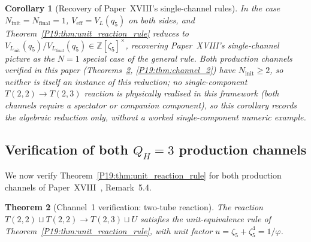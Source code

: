 \documentclass[11pt,a4paper]{article}
\newtheorem{theorem}{Theorem}[section]
\newtheorem{corollary}[theorem]{Corollary}
\theoremstyle{definition}\newtheorem{definition}[theorem]{Definition}
\theoremstyle{remark}
\newcommand{\vp}{\varphi}
\newcommand{\QH}{Q_H}
\newcommand{\Jones}{V}
\begin{document}
\begin{corollary}[Recovery of Paper~XVIII's single-channel rules]
\label{P19:cor:single_channel_recovery}
In the case $N_{\mathrm{init}}=N_{\mathrm{final}}=1$,
$\Jones_{\mathrm{eff}}=\Jones_{L}(q_5)$ on both sides, and
Theorem~\ref{P19:thm:unit_reaction_rule} reduces to
$\Jones_{L_{\mathrm{init}}}(q_5)/\Jones_{L_{\mathrm{final}}}(q_5)\in
\mathbb{Z}[\zeta_5]^\times$, recovering Paper~XVIII's single-channel
picture as the $N=1$ special case of the general rule.  Both
production channels verified in this paper (Theorems~\ref{P19:thm:channel_1},
\ref{P19:thm:channel_2}) have $N_{\mathrm{init}}\geq2$, so neither
is itself an instance of this reduction; no single-component
$T(2,2)\to T(2,3)$ reaction is physically realised in this
framework (both channels require a spectator or companion
component), so this corollary records the algebraic reduction only,
without a worked single-component numeric example.
\end{corollary}

\subsection{Verification of both $\QH=3$ production channels}

We now verify Theorem~\ref{P19:thm:unit_reaction_rule} for both
production channels of Paper~XVIII~\cite{Paper18},
Remark~5.4. %

\begin{theorem}[Channel~1 verification: two-tube reaction]
\label{P19:thm:channel_1}
The reaction
$T(2,2)\sqcup T(2,2)\to T(2,3)\sqcup U$
satisfies the unit-equivalence rule of
Theorem~\ref{P19:thm:unit_reaction_rule}, with unit factor
$u=\zeta_5+\zeta_5^4=1/\vp$.
\end{theorem}
\end{document}
